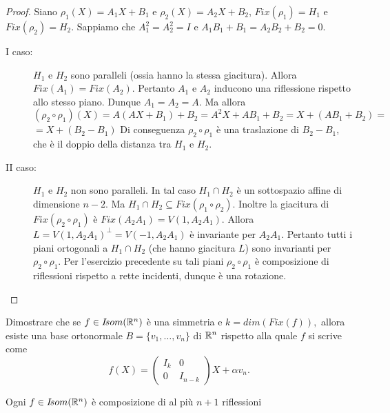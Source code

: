  \begin{proof}
Siano $\rho_1(X)=A_1X+B_1$ e $\rho_2(X)=A_2X+B_2$, $Fix(\rho_1)=H_1$ e
 $Fix(\rho_2)=H_2$. 
 Sappiamo che $A_1^2=A_2^2=I$ e $A_1B_1+B_1=A_2B_2+B_2=0$.
 
 \begin{description}
  \item[I caso:] $H_1$ e $H_2$ sono paralleli (ossia hanno la stessa giacitura).
 Allora $Fix(A_1)=Fix(A_2)$. Pertanto $A_1$ e $A_2$ inducono una riflessione rispetto allo stesso piano.
 Dunque $A_1=A_2=A$.
 Ma allora $(\rho_2\circ\rho_1)(X)=A(AX+B_1)+B_2=A^2X+AB_1+B_2=X+(AB_1+B_2)=$
 $=X+(B_2-B_1)$
 Di conseguenza $\rho_2\circ\rho_1$ è una traslazione di $B_2-B_1$, che è il doppio della distanza tra
 $H_1$ e $H_2$.
 \item[II caso: ] $H_1$ e $H_2$ non sono paralleli.
 In tal caso $H_1\cap H_2$ è un sottospazio affine di dimensione $n-2$.
 Ma $H_1\cap H_2\subseteq Fix(\rho_1\circ\rho_2)$.
 Inoltre la giacitura di $Fix(\rho_2\circ\rho_1)$ è
 $Fix(A_2A_1)=V(1,A_2A_1)$. Allora $L=V(1,A_2A_1)^{\bot}=V(-1,A_2A_1)$ è invariante per $A_2A_1$.
 Pertanto tutti i piani ortogonali a $H_1\cap H_2$ (che hanno giacitura $L$) sono invarianti per
 $\rho_2\circ\rho_1$.
 Per l'esercizio precedente su tali piani $\rho_2\circ\rho_1$ è composizione di riflessioni rispetto a rette incidenti,
 dunque è una rotazione.
 \end{description}
 \end{proof}
 
 \begin{exercise}
Dimostrare che se $f\in I\!som( \mathbb R^n)$ è una simmetria e
 $k=dim(Fix(f)),$ allora esiste una base ortonormale $B=\{v_1,\ldots,v_n\}$ di $\mathbb R^n$ rispetto alla quale
 $f$ si scrive come
 $$f(X)=\left(
 \begin{array}{cc}
  I_k & 0\\
  0 & I_{n-k}
 \end{array}
 \right)
 X+\alpha v_n.
 $$
 \end{exercise}
 
 \begin{theorem}
 Ogni $f\in I\!som( \mathbb R^n)$ è composizione di al più $n+1$ riflessioni
 \end{theorem}
 
